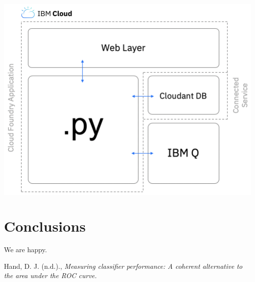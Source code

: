 \documentclass[twoside,twocolumn]{article}
\begin{document}
\begin{center}
\includegraphics[scale=0.4]{hl_architecture.png}
\end{center}


\section{Conclusions}

We are happy.






\begin{thebibliography}{99}

Hand, D. J. (n.d.).,
{\it Measuring classifier performance: A coherent alternative to the area under the ROC curve.}%

\end{thebibliography}

\end{document}
